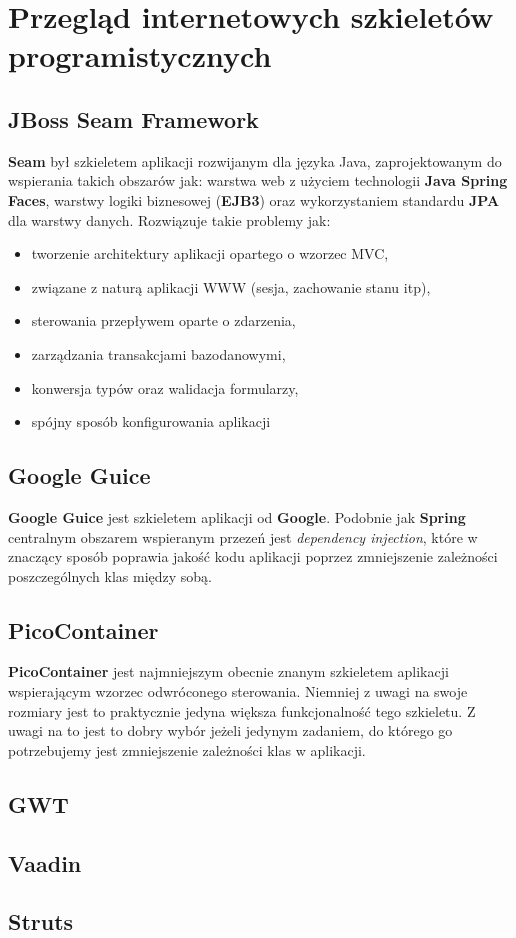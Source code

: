 \section{Przegląd internetowych szkieletów programistycznych}
	\subsection{JBoss Seam Framework}
		\textbf{Seam} był szkieletem aplikacji rozwijanym dla języka Java, zaprojektowanym do wspierania takich obszarów jak: warstwa web z użyciem 
		technologii \textbf{Java Spring Faces}, warstwy logiki biznesowej (\textbf{EJB3}) oraz wykorzystaniem standardu \textbf{JPA} dla warstwy
		danych. Rozwiązuje takie problemy jak:
		\begin{itemize}
			\item tworzenie architektury aplikacji opartego o wzorzec MVC,
			\item związane z naturą aplikacji WWW (sesja, zachowanie stanu itp),
			\item sterowania przepływem oparte o zdarzenia,
			\item zarządzania transakcjami bazodanowymi,
			\item konwersja typów oraz walidacja formularzy,
			\item spójny sposób konfigurowania aplikacji
		\end{itemize}
	
	\subsection{Google Guice}
		\textbf{Google Guice} jest szkieletem aplikacji od \textbf{Google}. Podobnie jak \textbf{Spring} centralnym obszarem wspieranym przezeń jest
		\textit{dependency injection}, które w znaczący sposób poprawia jakość kodu aplikacji poprzez zmniejszenie zależności poszczególnych klas
		między sobą.
	
	\subsection{PicoContainer}
		\textbf{PicoContainer} jest najmniejszym obecnie znanym szkieletem aplikacji wspierającym wzorzec odwróconego sterowania.
		Niemniej z uwagi na swoje rozmiary jest to praktycznie jedyna większa funkcjonalność tego szkieletu. Z uwagi na to jest to dobry wybór jeżeli
		jedynym zadaniem, do którego go potrzebujemy jest zmniejszenie zależności klas w aplikacji. 
		
	\subsection{GWT}
	\subsection{Vaadin}
	\subsection{Struts}